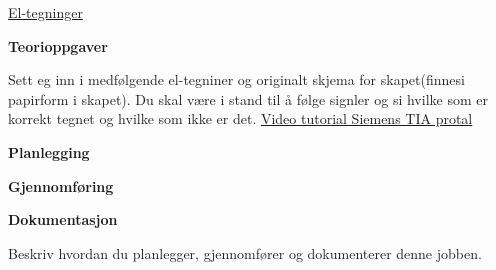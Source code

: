 \vskip 5pt 
\href{https://rfka-my.sharepoint.com/:u:/g/personal/fred-olav_mosdal_skole_rogfk_no/EW7P-15mngBEih-uNAI5QJ0BVCWk1hocxIb7Rn_Sc1Df-g?e=hLlaex}{El-tegninger}


\vskip 10pt 
\textbf{Teorioppgaver}

\vskip 5pt 
Sett eg inn i medfølgende el-tegniner og originalt skjema for skapet(finnesi papirform i skapet). Du skal være i stand til å følge signler og si hvilke som er korrekt tegnet og hvilke som ikke er det. 
\href{https://youtu.be/IqW5FCOWtC4}{Video tutorial Siemens TIA protal}

\vskip 10pt 
\textbf{Planlegging}


\vskip 10pt 
\textbf{Gjennomføring}

\vskip 10pt 
\textbf{Dokumentasjon}

Beskriv hvordan du planlegger, gjennomfører og dokumenterer denne jobben. 
















\vfil \eject

















